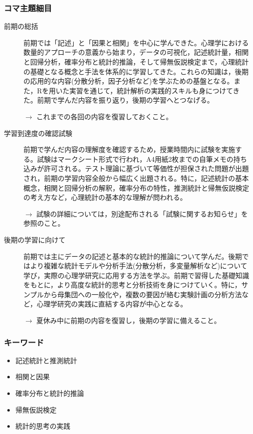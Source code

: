 \subsubsection{コマ主題細目}
\begin{description}
	\item[前期の総括] 前期では「記述」と「因果と相関」を中心に学んできた。心理学における数量的アプローチの意義から始まり，データの可視化，記述統計量，相関と回帰分析，確率分布と統計的推論，そして帰無仮説検定まで，心理統計の基礎となる概念と手法を体系的に学習してきた。これらの知識は，後期の応用的な内容(分散分析，因子分析など)を学ぶための基盤となる。また，Rを用いた実習を通じて，統計解析の実践的スキルも身につけてきた。前期で学んだ内容を振り返り，後期の学習へとつなげる。
	      \begin{flushright}
		      $\to$ これまでの各回の内容を復習しておくこと。
	      \end{flushright}

	\item[学習到達度の確認試験] 前期で学んだ内容の理解度を確認するため，授業時間内に試験を実施する。試験はマークシート形式で行われ，A4用紙2枚までの自筆メモの持ち込みが許可される。テスト理論に基づいて等価性が担保された問題が出題され，前期の学習内容全般から幅広く出題される。特に，記述統計の基本概念，相関と回帰分析の解釈，確率分布の特性，推測統計と帰無仮説検定の考え方など，心理統計の基本的な理解が問われる。
	      \begin{flushright}
		      $\to$ 試験の詳細については，別途配布される「試験に関するお知らせ」を参照のこと。
	      \end{flushright}

	\item[後期の学習に向けて] 前期では主にデータの記述と基本的な統計的推論について学んだ。後期ではより複雑な統計モデルや分析手法(分散分析，多変量解析など)について学び，実際の心理学研究に応用する方法を学ぶ。前期で習得した基礎知識をもとに，より高度な統計的思考と分析技術を身につけていく。特に，サンプルから母集団への一般化や，複数の要因が絡む実験計画の分析方法など，心理学研究の実践に直結する内容が中心となる。
	      \begin{flushright}
		      $\to$ 夏休み中に前期の内容を復習し，後期の学習に備えること。
	      \end{flushright}

\end{description}
\subsubsection{キーワード}
\begin{itemize}
	\item 記述統計と推測統計
	\item 相関と因果
	\item 確率分布と統計的推論
	\item 帰無仮説検定
	\item 統計的思考の実践
\end{itemize}
